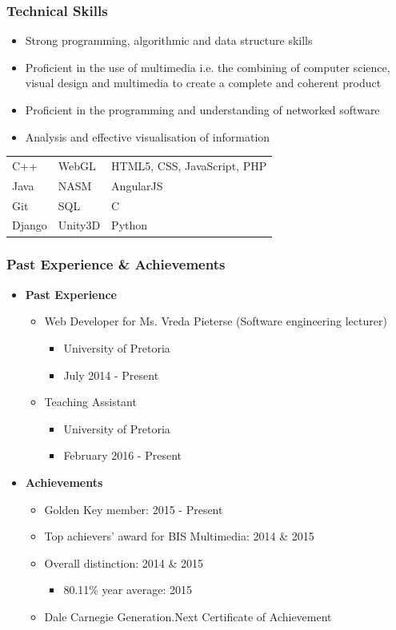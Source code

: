 \documentclass{article}
\begin{document}
\subsubsection{Technical Skills}
\begin{itemize}
	\item Strong programming, algorithmic and data structure skills
	\item Proficient in the use of multimedia i.e. the combining of computer science, visual design and multimedia to create a complete and coherent product
	\item Proficient in the programming and understanding of networked software
	\item Analysis and effective visualisation of information
\end{itemize}
\begin{tabular}{| l | l | l |}
	C++		& WebGL		& HTML5, CSS, JavaScript, PHP   	\\
	Java    & NASM     	& AngularJS							\\
	Git 	& SQL     	& C									\\
	Django 	& Unity3D 	& Python                     
\end{tabular}

\subsubsection{Past Experience \& Achievements}
\begin{itemize}
	\item \textbf{Past Experience}
	\begin{itemize}
		\item Web Developer for Ms. Vreda Pieterse (Software engineering lecturer)
		\begin{itemize}
			\item University of Pretoria
			\item July 2014 - Present
		\end{itemize}
		\item Teaching Assistant
		\begin{itemize}
			\item University of Pretoria
			\item February 2016 - Present
		\end{itemize}
	\end{itemize}
	
	\item \textbf{Achievements}
	\begin{itemize}
		\item Golden Key member: 2015 - Present
		\item Top achievers' award for BIS Multimedia: 2014 \& 2015
		\item Overall distinction: 2014 \& 2015
		\begin{itemize}
			\item 80.11\% year average: 2015
		\end{itemize}
		\item Dale Carnegie Generation.Next Certificate of Achievement
	\end{itemize}
\end{itemize}
\end{document}
